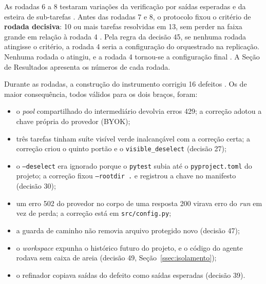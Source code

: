 \begin{novobloco}
As rodadas 6 a 8 testaram variações da verificação por saídas esperadas e da esteira de sub-tarefas . Antes das rodadas 7 e 8, o protocolo fixou o critério de \textbf{rodada decisiva}: 10 ou mais tarefas resolvidas em 13, sem perder na faixa grande em relação à rodada 4 . Pela regra da decisão 45, se nenhuma rodada atingisse o critério, a rodada 4 seria a configuração do orquestrado na replicação. Nenhuma rodada o atingiu, e a rodada 4 tornou-se a configuração final . A Seção de Resultados apresenta os números de cada rodada.

Durante as rodadas, a construção do instrumento corrigiu 16 defeitos . Os de maior consequência, todos válidos para os dois braços, foram:

\begin{itemize}
    \item o \textit{pool} compartilhado do intermediário devolvia erros 429; a correção adotou a chave própria do provedor (BYOK);
    \item três tarefas tinham suíte visível verde inalcançável com a correção certa; a correção criou o quinto portão e o \texttt{visible\_deselect} (decisão 27);
    \item o \texttt{--deselect} era ignorado porque o \texttt{pytest} subia até o \texttt{pyproject.toml} do projeto; a correção fixou \texttt{--rootdir .} e registrou a chave no manifesto (decisão 30);
    \item um erro 502 do provedor no corpo de uma resposta 200 virava erro do \textit{run} em vez de perda; a correção está em \texttt{src/config.py};
    \item a guarda de caminho não removia arquivo protegido novo (decisão 47);
    \item o \textit{workspace} expunha o histórico futuro do projeto, e o código do agente rodava sem caixa de areia (decisão 49, Seção~\ref{ssec:isolamento});
    \item o refinador copiava saídas do defeito como saídas esperadas (decisão 39).
\end{itemize}
\end{novobloco}

